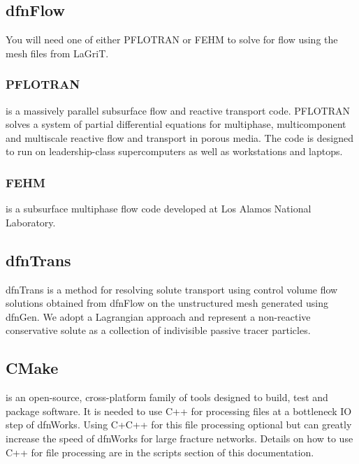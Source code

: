 \documentclass[letterpaper,10pt,english]{sphinxmanual}
\begin{document}
\subsection{dfnFlow}
\label{\detokenize{intro:dfnflow}}\label{\detokenize{intro:id1}}
You will need one of either PFLOTRAN or FEHM to solve for flow using the
mesh files from LaGriT.


\subsubsection{PFLOTRAN}
\label{\detokenize{intro:pflotran}}
  is a massively parallel subsurface flow and reactive transport
code. PFLOTRAN solves a system of partial differential equations for
multiphase, multicomponent and multiscale reactive flow and transport in
porous media. The code is designed to run on leadership-class supercomputers
as well as workstations and laptops.


\subsubsection{FEHM}
\label{\detokenize{intro:id2}}\label{\detokenize{intro:fehm}}
 is a subsurface multiphase flow code developed at Los Alamos National
Laboratory.


\subsection{dfnTrans}
\label{\detokenize{intro:id3}}\label{\detokenize{intro:dfntrans}}
dfnTrans is a method for resolving solute transport using control volume flow
solutions obtained from dfnFlow on the unstructured mesh generated using
dfnGen. We adopt a Lagrangian approach and represent a non-reactive
conservative solute as a collection of indivisible passive tracer particles.


\subsection{CMake}
\label{\detokenize{intro:cmake}}
 is an open-source, cross-platform family of tools designed to build,
test and package software. It is needed to use C++ for processing files at a
bottleneck IO step of dfnWorks. Using C+C++ for this file processing optional
but can greatly increase the speed of dfnWorks for large fracture networks.
Details on how to use C++ for file processing are in the scripts section of
this documentation.
\end{document}
